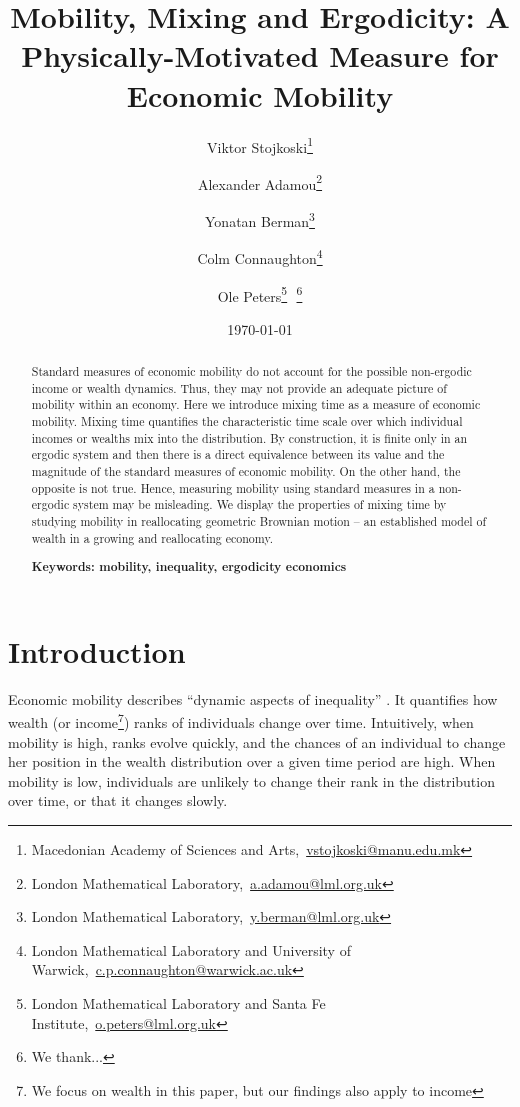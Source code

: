 \documentclass[11pt]{article}
\newcommand{\bc}{\begin{center}}
\newcommand{\ec}{\end{center}}
\newcommand{\red}[1]{{\color{red} #1}}
\numberwithin{equation}{section}
\begin{document}
\begin{titlepage}
\title{Mobility, Mixing and Ergodicity: A Physically-Motivated Measure for Economic Mobility}
\author{Viktor Stojkoski\footnote{Macedonian Academy of Sciences and Arts,~\url{vstojkoski@manu.edu.mk}} \and Alexander Adamou\footnote{London Mathematical Laboratory,~\url{a.adamou@lml.org.uk}} \and Yonatan Berman\footnote{London Mathematical Laboratory,~\url{y.berman@lml.org.uk}} \and Colm Connaughton\footnote{London Mathematical Laboratory and University of Warwick,~\url{c.p.connaughton@warwick.ac.uk}} \and Ole Peters\footnote{London Mathematical Laboratory and Santa Fe Institute,~\url{o.peters@lml.org.uk}}\,\, \thanks{We thank...}}
\date{\today}
\maketitle
\begin{abstract}
\noindent Standard measures of economic mobility do not account for the possible non-ergodic income or wealth dynamics. Thus, they may not provide an adequate picture of mobility within an economy. Here we introduce mixing time as a measure of economic mobility. Mixing time quantifies the characteristic time scale over which individual incomes or wealths mix into the distribution. By construction, it is finite only in an ergodic system and then there is a direct equivalence between its value and the magnitude of the standard measures of economic mobility. On the other hand, the opposite is not true. Hence, measuring mobility using standard measures in a non-ergodic system may be misleading. We display the properties of mixing time by studying mobility in reallocating geometric Brownian motion -- an established model of wealth in a growing and reallocating economy.

\noindent\textbf{Keywords: mobility, inequality, ergodicity economics}
\end{abstract}
\setcounter{page}{0}
\thispagestyle{empty}
\end{titlepage}
\pagebreak \newpage
\section{Introduction}\label{sec:introduction}
Economic mobility describes ``dynamic aspects of inequality'' \citep{Shorrocks1978}. It quantifies how wealth (or income\footnote{We focus on wealth in this paper, but our findings also apply to income}) ranks of individuals change over time. Intuitively, when mobility is high, ranks evolve quickly, and the chances of an individual to change her position in the wealth distribution over a given time period are high. When mobility is low, individuals are unlikely to change their rank in the distribution over time, or that it changes slowly.
\end{document}
